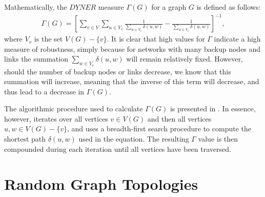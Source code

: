 \documentclass[doc]{apa}%
\begin{document}
Mathematically, the $DYNER$ measure $\Gamma(G)$ for a graph $G$ is defined as follows:
\begin{eqnarray}
\Gamma(G) = \left[\sum_{v \in V}\sum_{u \in V_v}\frac{1}{\sum_{w \in V_v}\delta(u,w)} - \frac{1}{\sum_{w \in V_v}\delta(u,w)}\right]^{-1},
\end{eqnarray}
where $V_v$ is the set $V(G) - \{v\}$. It is clear that high values for $\Gamma$ indicate a high measure of robustness, simply because for networks with many backup nodes and links the summation $\sum_{w \in V_v}\delta(u,w)$ will remain relatively fixed. However, should the number of backup nodes or links decrease, we know that this summation will increase, meaning that the inverse of this term will decrease, and thus lead to a decrease in $\Gamma(G)$. 

The algorithmic procedure used to calculate $\Gamma(G)$ is presented in \cite{singerdynamic}. In essence, however, iterates over all vertices $v \in V(G)$ and then all vertices $u, w \in V(G) - \{v\}$, and uses a breadth-first search procedure to compute the shortest path $\delta(u, w)$ used in the equation. The resulting $\Gamma$ value is then compounded during each iteration until all vertices have been traversed. 

\section{Random Graph Topologies}

\end{document}
